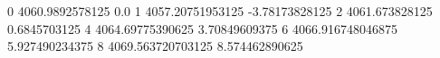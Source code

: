 0 4060.9892578125 0.0
1 4057.20751953125 -3.78173828125
2 4061.673828125 0.6845703125
4 4064.69775390625 3.70849609375
6 4066.916748046875 5.927490234375
8 4069.563720703125 8.574462890625
